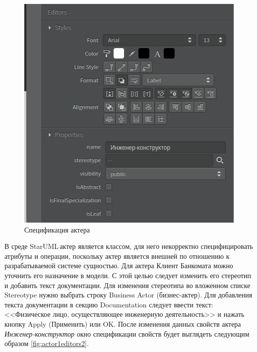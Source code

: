 \documentclass[a4paper,12pt]{report}
\newcommand{\staruml}{StarUML\,\tm}
\begin{document}
\newpage
\begin{figure}[htbp]
	\centering
	\includegraphics[width=0.5\linewidth]{images/actor1editors}
	\caption{Спецификация актера}
	\label{fig:actor1editors}
\end{figure}

В среде \staruml актер является классом, для него некорректно специфицировать атрибуты и операции, поскольку актер является внешней по отношению к разрабатываемой системе сущностью.
Для актера Клиент Банкомата можно уточнить его назначение в модели. С этой целью следует изменить его стереотип и добавить текст документации. Для изменения стереотипа во вложенном списке Stereotype нужно выбрать строку Business Actor (бизнес-актер). Для добавления текста документации в секцию Documentation следует ввести текст: <<Физическое лицо, осуществляющее инженерную деятельность>> и нажать кнопку Apply (Применить) или OK. После изменения данных свойств актера \textit{Инженер-конструктор} окно спецификации свойств будет выглядеть следующим образом \ref{fig:actor1editors2}.
\end{document}

